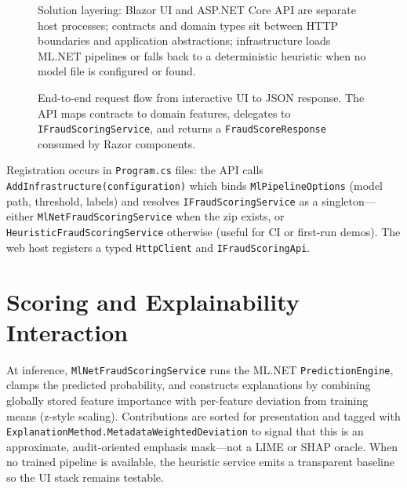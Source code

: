 \begin{figure}[htbp]
\centering
\resizebox{\linewidth}{!}{}
\caption{Solution layering: Blazor UI and ASP.NET Core API are separate host processes; contracts and domain types sit between HTTP boundaries and application abstractions; infrastructure loads ML.NET pipelines or falls back to a deterministic heuristic when no model file is configured or found.}
\label{fig:clean-arch-layers}
\end{figure}

\begin{figure}[htbp]
\centering
\resizebox{\linewidth}{!}{}
\caption{End-to-end request flow from interactive UI to JSON response. The API maps contracts to domain features, delegates to \texttt{IFraud\allowbreak ScoringService}, and returns a \texttt{Fraud\allowbreak Score\allowbreak Response} consumed by Razor components.}
\label{fig:request-flow}
\end{figure}

Registration occurs in \texttt{Program.cs} files: the API calls \texttt{AddInfrastructure(\allowbreak configuration)} which binds \texttt{Ml\allowbreak Pipeline\allowbreak Options} (model path, threshold, labels) and resolves \texttt{IFraud\allowbreak ScoringService} as a singleton---either \texttt{MlNet\allowbreak Fraud\allowbreak ScoringService} when the zip exists, or \texttt{Heuristic\allowbreak Fraud\allowbreak ScoringService} otherwise (useful for CI or first-run demos). The web host registers a typed \texttt{HttpClient} and \texttt{IFraud\allowbreak ScoringApi}.

\section{Scoring and Explainability Interaction}
\label{sec:scoring-explainability}
At inference, \texttt{MlNet\allowbreak Fraud\allowbreak ScoringService} runs the ML.NET \texttt{Prediction\allowbreak Engine}, clamps the predicted probability, and constructs explanations by combining globally stored feature importance with per-feature deviation from training means (z-style scaling). Contributions are sorted for presentation and tagged with \texttt{Explanation\allowbreak Method.\allowbreak Metadata\allowbreak Weighted\allowbreak Deviation} to signal that this is an approximate, audit-oriented emphasis mask---not a LIME or SHAP oracle. When no trained pipeline is available, the heuristic service emits a transparent baseline so the UI stack remains testable.

